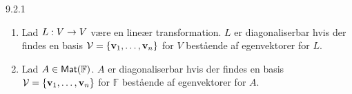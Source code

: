%
%

\begin{definition}{9.2.1}
	\begin{enumerate}
		\item Lad $L : V \rightarrow V$ være en lineær transformation. $L$ er
			diagonaliserbar hvis der findes en basis $\mathcal{V} = \{ \mathbf{v}_1, \dotsc,
			\mathbf{v}_n \}$ for $V$ bestående af egenvektorer for $L$.
		\item Lad $A \in \textsf{Mat}(\mathbb{F})$. $A$ er diagonaliserbar hvis der
			findes en basis $\mathcal{V} = \{ \mathbf{v}_1, \dotsc, \mathbf{v}_n \}$ for $\mathbb{F}$
			bestående af egenvektorer for $A$.
	\end{enumerate}
\end{definition}
